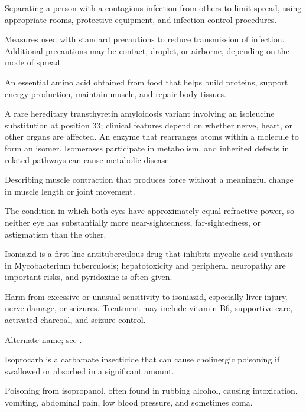  Separating a person with a contagious infection from others to limit spread, using appropriate rooms, protective equipment, and infection-control procedures.

 Measures used with standard precautions to reduce transmission of infection. Additional precautions may be contact, droplet, or airborne, depending on the mode of spread.

 An essential amino acid obtained from food that helps build proteins, support energy production, maintain muscle, and repair body tissues.

 A rare hereditary transthyretin amyloidosis variant involving an isoleucine substitution at position 33; clinical features depend on whether nerve, heart, or other organs are affected.
 An enzyme that rearranges atoms within a molecule to form an isomer. Isomerases participate in metabolism, and inherited defects in related pathways can cause metabolic disease.

 Describing muscle contraction that produces force without a meaningful change in muscle length or joint movement.

 The condition in which both eyes have approximately equal refractive power, so neither eye has substantially more near-sightedness, far-sightedness, or astigmatism than the other.

 Isoniazid is a first-line antituberculous drug that inhibits mycolic-acid synthesis in Mycobacterium tuberculosis; hepatotoxicity and peripheral neuropathy are important risks, and pyridoxine is often given.

 Harm from excessive or unusual sensitivity to isoniazid, especially liver injury, nerve damage, or seizures. Treatment may include vitamin B6, supportive care, activated charcoal, and seizure control.

 Alternate name; see .

 Isoprocarb is a carbamate insecticide that can cause cholinergic poisoning if swallowed or absorbed in a significant amount.

 Poisoning from isopropanol, often found in rubbing alcohol, causing intoxication, vomiting, abdominal pain, low blood pressure, and sometimes coma.

